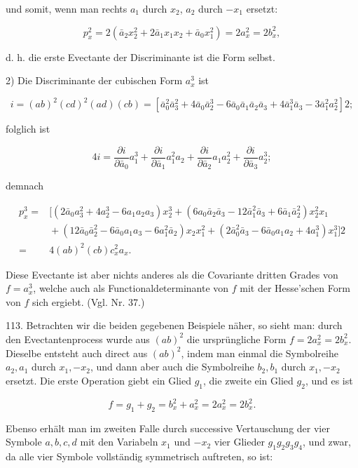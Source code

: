 und somit, wenn man rechts $a_1$ durch $x_2$, $a_2$ durch $-x_1$ ersetzt:

\[
p_x^2 = 2(\bar a_2x_2^2+2\bar a_1x_1x_2+\bar a_0x_1^2)=2a_x^2=2b_x^2,
\]

d. h. die erste Evectante der Discriminante ist die Form selbst.


2) Die Discriminante der cubischen Form $a_x^3$ ist

\[
i=(ab)^2(cd)^2(ad)(cb)=[\bar a_0^2\bar a_3^2+4\bar a_0\bar a_2^3-6\bar a_0\bar a_1\bar a_2\bar a_3+4\bar a_1^3\bar a_3-3\bar a_1^2a_2^2]2;
\]

folglich ist

\[
4i=\frac{\partial i}{\partial \bar a_0}a_1^3+\frac{\partial i}{\partial \bar a_1}a_1^2a_2+\frac{\partial i}{\partial \bar a_2}a_1a_2^2+\frac{\partial i}{\partial \bar a_3}a_2^3;
\]

demnach

\[
\begin{aligned}
p_x^3 = {} & [(2\bar a_0a_3^2+4a_2^3-6a_1a_2a_3)x_2^3+(6a_0\bar a_2\bar a_3-12\bar a_1^2\bar a_3+6\bar a_1\bar a_2^2)x_2^2x_1\\
& {}+(12\bar a_0\bar a_2^2-6\bar a_0a_1a_3-6a_1^2\bar a_2)x_2x_1^2+(2\bar a_0^2\bar a_3-6\bar a_0a_1a_2+4a_1^3)x_1^3]2\\
= {} & 4(ab)^2(cb)c_x^2a_x.
\end{aligned}
\]

Diese Evectante ist aber nichts anderes als die Covariante dritten Grades von $f=a_x^3$, welche auch als Functionaldeterminante von $f$ mit der Hesse'schen Form von $f$ sich ergiebt. (Vgl. Nr. 37.)

113.  Betrachten wir die beiden gegebenen Beispiele näher, so sieht man: durch den Evectantenprocess wurde aus $(ab)^2$ die ursprüngliche Form $f=2a_x^2=2b_x^2$. Dieselbe entsteht auch direct aus $(ab)^2$, indem man einmal die Symbolreihe $a_2,a_1$ durch $x_1,-x_2$, und dann aber auch die Symbolreihe $b_2,b_1$ durch $x_1,-x_2$ ersetzt. Die erste Operation giebt ein Glied $g_1$, die zweite ein Glied $g_2$, und es ist

\[
f=g_1+g_2=b_x^2+a_x^2=2a_x^2=2b_x^2.
\]

Ebenso erhält man im zweiten Falle durch successive Vertauschung der vier Symbole $a,b,c,d$ mit den Variabeln $x_1$ und $-x_2$ vier Glieder $g_1g_2g_3g_4$, und zwar, da alle vier Symbole vollständig symmetrisch auftreten, so ist:

